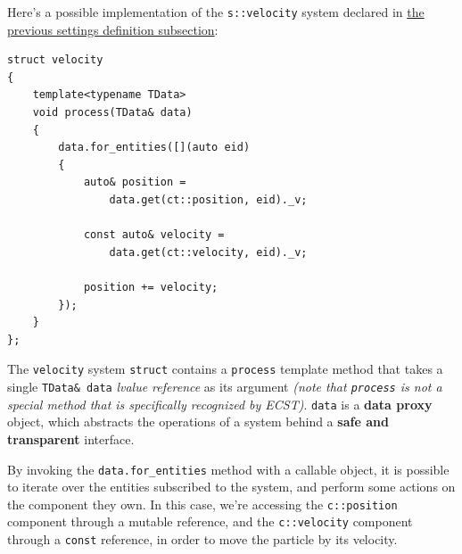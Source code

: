 \documentclass[twoside, 12pt, a4paper, openany]{book}
\begin{document}
Here's a possible implementation of the
\texttt{s::velocity}
system declared in
\protect\hyperlink{code_example_settings_definition}{the previous
settings definition subsection}:

\begin{verbatim}
struct velocity
{
    template<typename TData>
    void process(TData& data)
    {
        data.for_entities([](auto eid)
        {
            auto& position =
                data.get(ct::position, eid)._v;

            const auto& velocity =
                data.get(ct::velocity, eid)._v;

            position += velocity;
        });
    }
};
\end{verbatim}

The
\texttt{velocity}
system
\texttt{struct}
contains a
\texttt{process}
template method that takes a single
\texttt{TData& data}
\emph{lvalue reference} as its argument \emph{(note that
\texttt{process}
is not a special method that is specifically recognized by ECST)}.
\texttt{data}
is a \textbf{data proxy} object, which abstracts the operations of a
system behind a \textbf{safe and transparent} interface.

By invoking the
\texttt{data.for_entities}
method with a callable object, it is possible to iterate over the
entities subscribed to the system, and perform some actions on the
component they own. In this case, we're accessing the
\texttt{c::position}
component through a mutable reference, and the
\texttt{c::velocity}
component through a
\texttt{const}
reference, in order to move the particle by its velocity.
\end{document}
